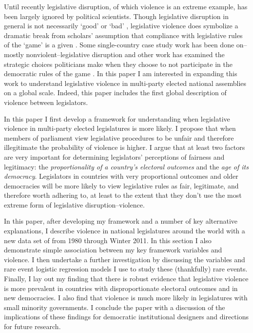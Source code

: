 \documentclass[a4paper]{article}\usepackage{graphicx, color}
\begin{document}
Until recently legislative disruption, of which violence is an extreme example, has been largely ignored by political scientists. Though legislative disruption in general is not necessarily `good' or `bad' \citep[see][for discussions of how disruption may be a `safety valve' in contexts where dissent is strongly curtailed]{Ostrow1996,Young2002}, legislative violence does symbolize a dramatic break from scholars' assumption that compliance with legislative rules of the `game' is a given \cite{Wolfe2004}. Some single-country case study work has been done on--mostly nonviolent--legislative disruption \cite[see][]{Armitage2013,Johnson2013,Ilie2013,Wolfe2004} and other work has examined the strategic choices politicians make when they choose to not participate in the democratic rules of the game \citep[e.g.][on election boycotts]{Beaulieu2008}. In this paper I am interested in expanding this work to understand legislative violence in multi-party elected national assemblies on a global scale. Indeed, this paper includes the first global description of violence between legislators. 

In this paper I first develop a framework for understanding when legislative violence in multi-party elected legislatures is more likely. I propose that when members of parliament view legislative procedures to be unfair and therefore illegitimate the probability of violence is higher. I argue that at least two factors are very important for determining legislators' perceptions of fairness and legitimacy: the \emph{proportionality of a country's electoral outcomes} and the \emph{age of its democracy}. Legislators in countries with very proportional outcomes and older democracies will be more likely to view legislative rules as fair, legitimate, and therefore worth adhering to, at least to the extent that they don't use the most extreme form of legislative disruption--violence. 

In this paper, after developing my framework and a number of key alternative explanations, I describe violence in national legislatures around the world with a new data set of from 1980 through Winter 2011. In this section I also demonstrate simple association between my key framework variables and violence. I then undertake a further investigation by discussing the variables and rare event logistic regression models \citep{KingRareEvents2001, KingRareEventsPA2001} I use to study these (thankfully) rare events. Finally, I lay out my finding that there is robust evidence that legislative violence is more prevalent in countries with disproportionate electoral outcomes and in new democracies. I also find that violence is much more likely in legislatures with small minority governments. I conclude the paper with a discussion of the implications of these findings for democratic institutional designers and directions for future research.
\end{document}
